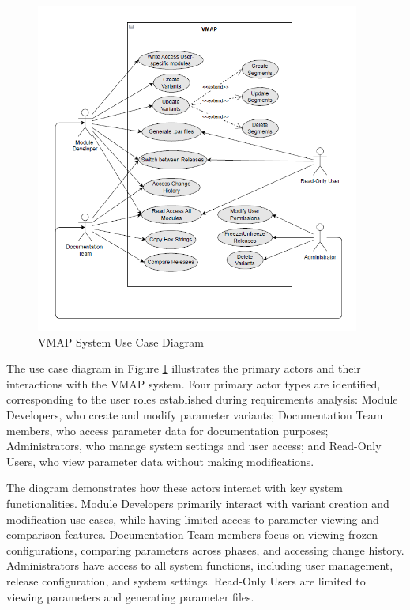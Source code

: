 \begin{figure}[h]
    \centering
    \includegraphics[width=0.95\textwidth]{figures/vmap_use_case_diagram.png}
    \caption{VMAP System Use Case Diagram}
    \label{fig:use-case-diagram}
\end{figure}

The use case diagram in Figure \ref{fig:use-case-diagram} illustrates the primary actors and their interactions with the VMAP system. Four primary actor types are identified, corresponding to the user roles established during requirements analysis: Module Developers, who create and modify parameter variants; Documentation Team members, who access parameter data for documentation purposes; Administrators, who manage system settings and user access; and Read-Only Users, who view parameter data without making modifications.

The diagram demonstrates how these actors interact with key system functionalities. Module Developers primarily interact with variant creation and modification use cases, while having limited access to parameter viewing and comparison features. Documentation Team members focus on viewing frozen configurations, comparing parameters across phases, and accessing change history. Administrators have access to all system functions, including user management, release configuration, and system settings. Read-Only Users are limited to viewing parameters and generating parameter files.

